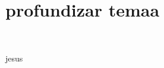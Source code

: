 \section{profundizar temaa} 
\textbf{}\\
\begin{flushleft}


\begin{itemize}


jesus

	


\end{itemize} 


\end{flushleft}